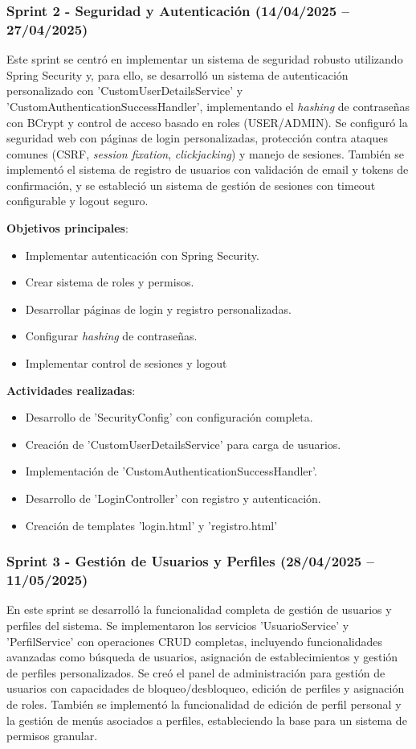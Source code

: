 \subsubsection{Sprint 2 - Seguridad y Autenticación (14/04/2025 – 27/04/2025)} 
Este sprint se centró en implementar un sistema de seguridad robusto utilizando Spring Security y, para ello, se desarrolló un sistema de autenticación personalizado con 'CustomUserDetailsService' y 'CustomAuthenticationSuccessHandler', implementando el \emph{hashing} de contraseñas con BCrypt y control de acceso basado en roles (USER/ADMIN). Se configuró la seguridad web con páginas de login personalizadas, protección contra ataques comunes (CSRF, \emph{session fixation}, \emph{clickjacking}) y manejo de sesiones. También se implementó el sistema de registro de usuarios con validación de email y tokens de confirmación, y se estableció un sistema de gestión de sesiones con timeout configurable y logout seguro.

\textbf{Objetivos principales}:
\begin{itemize}
\tightlist
\item
Implementar autenticación con Spring Security.
\item
Crear sistema de roles y permisos.
\item
Desarrollar páginas de login y registro personalizadas.
\item
Configurar \emph{hashing} de contraseñas.
\item
Implementar control de sesiones y logout
\end{itemize}

\textbf{Actividades realizadas}:
\begin{itemize}
\tightlist
\item
Desarrollo de 'SecurityConfig' con configuración completa.
\item
Creación de 'CustomUserDetailsService' para carga de usuarios.
\item
Implementación de 'CustomAuthenticationSuccessHandler'.
\item
Desarrollo de 'LoginController' con registro y autenticación.
\item
Creación de templates 'login.html' y 'registro.html'
\end{itemize}

\subsubsection{Sprint 3 - Gestión de Usuarios y Perfiles (28/04/2025 – 11/05/2025)} 
En este sprint se desarrolló la funcionalidad completa de gestión de usuarios y perfiles del sistema. Se implementaron los servicios 'UsuarioService' y 'PerfilService' con operaciones CRUD completas, incluyendo funcionalidades avanzadas como búsqueda de usuarios, asignación de establecimientos y gestión de perfiles personalizados. Se creó el panel de administración para gestión de usuarios con capacidades de bloqueo/desbloqueo, edición de perfiles y asignación de roles. También se implementó la funcionalidad de edición de perfil personal y la gestión de menús asociados a perfiles, estableciendo la base para un sistema de permisos granular.

